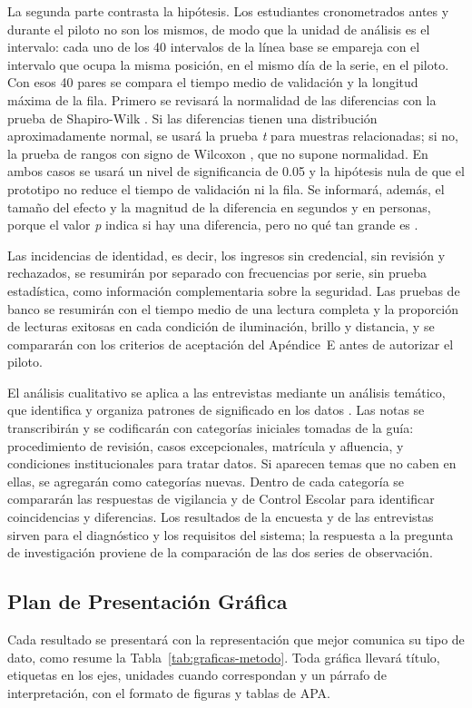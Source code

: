 La segunda parte contrasta la hipótesis. Los estudiantes cronometrados antes
y durante el piloto no son los mismos, de modo que la unidad de análisis es
el intervalo: cada uno de los 40 intervalos de la línea base se empareja con
el intervalo que ocupa la misma posición, en el mismo día de la serie, en el
piloto. Con esos 40 pares se compara el tiempo medio de validación y la
longitud máxima de la fila. Primero se revisará la normalidad de las
diferencias con la prueba de Shapiro-Wilk \parencite{shapiro1965normality}.
Si las diferencias tienen una distribución aproximadamente normal, se usará
la prueba \emph{t} para muestras relacionadas; si no, la prueba de rangos con
signo de Wilcoxon \parencite{wilcoxon1945ranking}, que no supone normalidad.
En ambos casos se usará un nivel de significancia de 0.05 y la hipótesis
nula de que el prototipo no reduce el tiempo de validación ni la fila. Se
informará, además, el tamaño del efecto y la magnitud de la diferencia en
segundos y en personas, porque el valor \emph{p} indica si hay una
diferencia, pero no qué tan grande es \parencite{sullivan2012effectsize}.

Las incidencias de identidad, es decir, los ingresos sin credencial, sin
revisión y rechazados, se resumirán por separado con frecuencias por serie,
sin prueba estadística, como información complementaria sobre la seguridad.
Las pruebas de banco se resumirán con el tiempo medio de una lectura completa
y la proporción de lecturas exitosas en cada condición de iluminación,
brillo y distancia, y se compararán con los criterios de aceptación del
Apéndice~E antes de autorizar el piloto.

El análisis cualitativo se aplica a las entrevistas mediante un análisis
temático, que identifica y organiza patrones de significado en los datos
\parencite{braun2006thematic}. Las notas se transcribirán y se codificarán
con categorías iniciales tomadas de la guía: procedimiento de revisión, casos
excepcionales, matrícula y afluencia, y condiciones institucionales para
tratar datos. Si aparecen temas que no caben en ellas, se agregarán como
categorías nuevas. Dentro de cada
categoría se compararán las respuestas de vigilancia y de Control Escolar
para identificar coincidencias y diferencias. Los resultados de la encuesta y
de las entrevistas sirven para el diagnóstico y los requisitos del sistema; la
respuesta a la pregunta de investigación proviene de la comparación de las
dos series de observación.

\subsection{Plan de Presentación Gráfica}
Cada resultado se presentará con la representación que mejor comunica su tipo
de dato, como resume la Tabla~\ref{tab:graficas-metodo}. Toda gráfica llevará
título, etiquetas en los ejes, unidades cuando correspondan y un párrafo de
interpretación, con el formato de figuras y tablas de APA.

